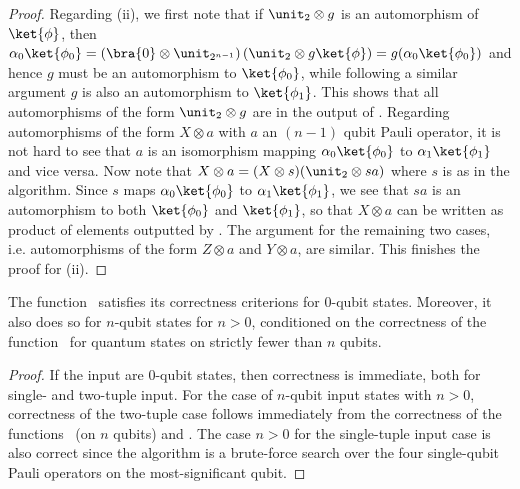 \begin{proof}
    Regarding (ii), we first note that if $\unit_2 \otimes g$ is an automorphism of $\ket{\phi}$, then $
    \alpha_0 \ket{\phi_0} =
    \left(\bra{0}\otimes \unit_{2^{n-1}}\right) \left(\unit_2 \otimes g \ket{\phi}\right) =
    g (\alpha_0 \ket{\phi_0})
    $
    and hence $g$ must be an automorphism to $\ket{\phi_0}$, while following a similar argument $g$ is also an automorphism to $\ket{\phi_1}$.
    This shows that all automorphisms of the form $\unit_2 \otimes g$ are in the output of \getautomorphisms.
    Regarding automorphisms of the form $X\otimes a$ with $a$ an $(n-1)$ qubit Pauli operator, it is not hard to see that $a$ is an isomorphism mapping $\alpha_0 \ket{\phi_0}$ to $\alpha_1 \ket{\phi_1}$ and vice versa.
    Now note that $X\otimes a = (X\otimes s)(\unit_2 \otimes s a)$ where $s$ is as in the algorithm.
    Since $s$ maps $\alpha_0 \ket{\phi_0}$ to $\alpha_1 \ket{\phi_1}$, we see that $sa$ is an automorphism to both $\ket{\phi_0}$ and $\ket{\phi_1}$, so that $X\otimes a$ can be written as product of elements outputted by \getautomorphisms.
    The argument for the remaining two cases, i.e. automorphisms of the form $Z\otimes a$ and $Y\otimes a$, are similar.
    This finishes the proof for (ii).
\end{proof}


\begin{lemma}
    \label{lemma:condition-correctness-2}
    The function \getsingleisomorphism~satisfies its correctness criterions for $0$-qubit states.
    Moreover, it also does so for $n$-qubit states for $n>0$, conditioned on the correctness of the function \getautomorphisms~for quantum states on strictly fewer than $n$ qubits.
\end{lemma}
\begin{proof}
    If the input are $0$-qubit states, then correctness is immediate, both for single- and two-tuple input.
    For the case of $n$-qubit input states with $n>0$, correctness of the two-tuple case follows immediately from the correctness of the functions \getautomorphisms~(on $n$ qubits) and \findisomorphismsetintersection.
    The case $n>0$ for the single-tuple input case is also correct since the algorithm is a brute-force search over the four single-qubit Pauli operators on the most-significant qubit.
\end{proof}

